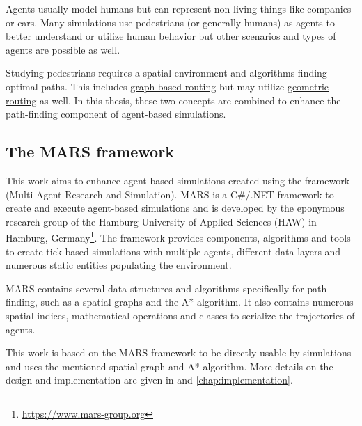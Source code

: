 	Agents usually model humans but can represent non-living things like companies or cars.
	Many simulations use pedestrians (or generally humans) as agents to better understand or utilize human behavior but other scenarios and types of agents are possible as well\cite{macal-introductory-tutorial}.

	Studying pedestrians requires a spatial environment and algorithms finding optimal paths\cite{kneidl-borrmann-hartmann-navigation,gloor-hybrid-pedestrian-routing,teknomo-millonig-routing}.
	This includes \hyperref[sec:graph-routing]{graph-based routing} but may utilize \hyperref[sec:geometric-routing]{geometric routing} as well\cite{kneidl-borrmann-hartmann-navigation}.
	In this thesis, these two concepts are combined to enhance the path-finding component of agent-based simulations.
	
	\subsection{The MARS framework}
	
		This work aims to enhance agent-based simulations created using the framework  (Multi-Agent Research and Simulation).
		MARS is a C\#/.NET framework to create and execute agent-based simulations and is developed by the eponymous research group of the Hamburg University of Applied Sciences (HAW) in Hamburg, Germany\footnote{\url{https://www.mars-group.org}}.
		The framework provides components, algorithms and tools to create tick-based simulations with multiple agents, different data-layers and numerous static entities populating the environment.
		
		MARS contains several data structures and algorithms specifically for path finding, such as a spatial graphs and the A* algorithm.
		It also contains numerous spatial indices, mathematical operations and classes to serialize the trajectories of agents.
		 
		This work is based on the MARS framework to be directly usable by simulations and uses the mentioned spatial graph and A* algorithm.
		More details on the design and implementation are given in  and \ref{chap:implementation}.